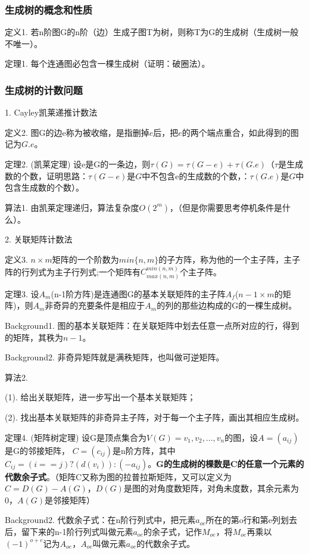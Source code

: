 \documentclass{article}
\begin{document}
\subsubsection{生成树的概念和性质}

定义1. 若n阶图G的n阶（边）生成子图T为树，则称T为G的生成树（生成树一般不唯一）。

定理1. 每个连通图必包含一棵生成树（证明：破圈法）。

\subsubsection{生成树的计数问题}

1. Cayley凯莱递推计数法

定义2. 图G的边e称为被收缩，是指删掉$e$后，把$e$的两个端点重合，如此得到的图记为$G.e$。

定理2. (凯莱定理) 设e是G的一条边，则$\tau(G) = \tau(G-e) + \tau(G.e)$（$\tau$是生成数的个数，证明思路：$\tau(G-e)$是$G$中不包含e的生成数的个数，：$\tau(G.e)$是$G$中包含生成数的个数）。

算法1. 由凯莱定理递归，算法复杂度$O(2^m)$，（但是你需要思考停机条件是什么）。

2. 关联矩阵计数法

定义3. $n\times m$矩阵的一个阶数为$min\{n,m\}$的子方阵，称为他的一个主子阵，主子阵的行列式为主子行列式;一个矩阵有$C_{max(n,m)}^{min(n,m)}$个主子阵。

定理3. 设$A_m$(n-1阶方阵)是连通图G的基本关联矩阵的主子阵$A_f$($n-1\times m$的矩阵)，则$A_m$非奇异的充要条件是相应于$A_m$的列的那些边构成的G的一棵生成树。

Background1. 图的基本关联矩阵：在关联矩阵中划去任意一点所对应的行，得到的矩阵，其秩为$n-1$。

Background2. 非奇异矩阵就是满秩矩阵，也叫做可逆矩阵。

算法2. 

\quad\quad (1). 给出关联矩阵，进一步写出一个基本关联矩阵；
    
\quad\quad (2). 找出基本关联矩阵的非奇异主子阵，对于每一个主子阵，画出其相应生成树。

定理4. (矩阵树定理) 设G是顶点集合为$V(G) = {v_1,v_2,...,v_n}$的图，设$A = (a_{i j})$是G的邻接矩阵， $C = (c_{i j})$是n阶方阵，其中 $C_{i j} = (i == j)  ?  (d(v_i)) : (-a_{i j})$。\textbf{G的生成树的棵数是C的任意一个元素的代数余子式}。（矩阵C又称为图的拉普拉斯矩阵，又可以定义为$C = D(G)-A(G)$，$D(G)$是图的对角度数矩阵，对角未度数，其余元素为0，$A(G)$是邻接矩阵）

Background2. 代数余子式：在n阶行列式中，把元素$a_{o e}$所在的第o行和第e列划去后，留下来的n-1阶行列式叫做元素$a_{o e}$的余子式，记作$M_{o e}$，将$M_{o e}$再乘以$(-1)^{o+e}$记为$A_{o e}$，$A_{o e}$叫做元素$a_{o e}$的代数余子式。
\end{document}
